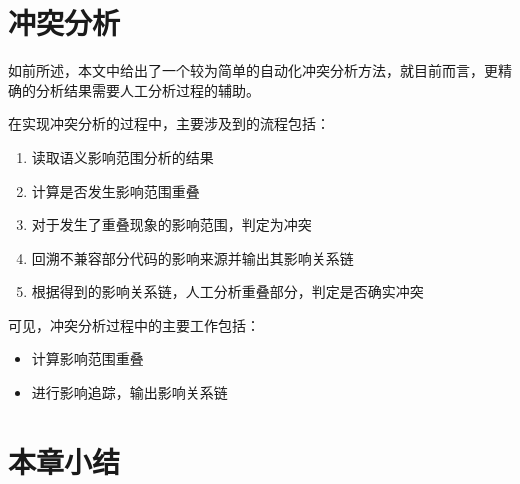 \section{冲突分析}

如前所述，本文中给出了一个较为简单的自动化冲突分析方法，就目前而言，更精确的分析结果需要人工分析过程的辅助。

在实现冲突分析的过程中，主要涉及到的流程包括：
\begin{enumerate}
	\item 读取语义影响范围分析的结果
	\item 计算是否发生影响范围重叠
	\item 对于发生了重叠现象的影响范围，判定为冲突
	\item 回溯不兼容部分代码的影响来源并输出其影响关系链
	\item 根据得到的影响关系链，人工分析重叠部分，判定是否确实冲突
\end{enumerate}

可见，冲突分析过程中的主要工作包括：
\begin{itemize}
	\item 计算影响范围重叠
	\item 进行影响追踪，输出影响关系链
\end{itemize}

\section{本章小结}